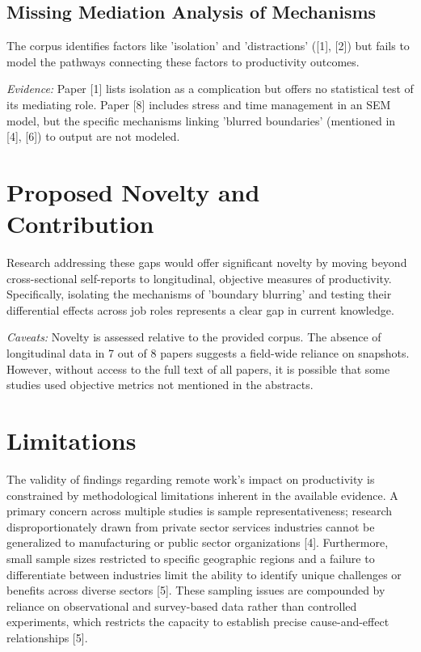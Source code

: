 \documentclass[conference]{IEEEtran}
\begin{document}
\subsection{Missing Mediation Analysis of Mechanisms}
The corpus identifies factors like 'isolation' and 'distractions' ([1], [2]) but fails to model the pathways connecting these factors to productivity outcomes.

\textit{Evidence:} Paper [1] lists isolation as a complication but offers no statistical test of its mediating role. Paper [8] includes stress and time management in an SEM model, but the specific mechanisms linking 'blurred boundaries' (mentioned in [4], [6]) to output are not modeled.

\section{Proposed Novelty and Contribution}
Research addressing these gaps would offer significant novelty by moving beyond cross-sectional self-reports to longitudinal, objective measures of productivity. Specifically, isolating the mechanisms of 'boundary blurring' and testing their differential effects across job roles represents a clear gap in current knowledge.

\textit{Caveats:} Novelty is assessed relative to the provided corpus. The absence of longitudinal data in 7 out of 8 papers suggests a field-wide reliance on snapshots. However, without access to the full text of all papers, it is possible that some studies used objective metrics not mentioned in the abstracts.

\section{Limitations}
The validity of findings regarding remote work's impact on productivity is constrained by methodological limitations inherent in the available evidence. A primary concern across multiple studies is sample representativeness; research disproportionately drawn from private sector services industries cannot be generalized to manufacturing or public sector organizations [4]. Furthermore, small sample sizes restricted to specific geographic regions and a failure to differentiate between industries limit the ability to identify unique challenges or benefits across diverse sectors [5]. These sampling issues are compounded by reliance on observational and survey-based data rather than controlled experiments, which restricts the capacity to establish precise cause-and-effect relationships [5].
\end{document}

